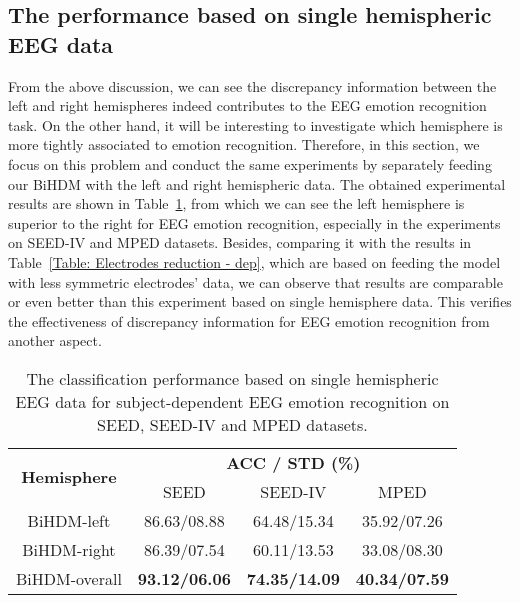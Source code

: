 \documentclass[journal]{IEEEtran}
\begin{document}
\subsection{The performance based on single hemispheric EEG data}
From the above discussion, we can see the discrepancy information between the left and right hemispheres indeed contributes to the EEG emotion recognition task. On the other hand, it will be interesting to investigate which hemisphere is more tightly associated to emotion recognition. Therefore, in this section, we focus on this problem and conduct the same experiments by separately feeding our BiHDM with the left and right hemispheric data. The obtained experimental results are shown in Table~\ref{Table: Single hemisphere}, from which we can see the left hemisphere is superior to the right for EEG emotion recognition, especially in the experiments on SEED-IV and MPED datasets. Besides, comparing it with the results in Table~\ref{Table: Electrodes reduction - dep}, which are based on feeding the model with less symmetric electrodes' data, we can observe that results are comparable or even better than this experiment based on single hemisphere data. This verifies the effectiveness of discrepancy information for EEG emotion recognition from another aspect.
\begin{table}[htb]
	\caption{The classification performance based on single hemispheric EEG data for subject-dependent EEG emotion recognition on SEED, SEED-IV and MPED datasets.}
	\centering
	\renewcommand{\arraystretch}{1.3}
	\begin{threeparttable}		
		\begin{tabular}{|c|c|c|c|} \hline
			\multirow{2}{*}{\textbf{Hemisphere}} & \multicolumn{3}{c|}{\textbf{ACC / STD (\%)}} \\ \cline{2-4}
			&  SEED            & SEED-IV          &   MPED\\ \hline
			BiHDM-left        & 86.63/08.88      & 64.48/15.34     & 35.92/07.26 \\ \hline
			BiHDM-right       & 86.39/07.54      & 60.11/13.53     & 33.08/08.30             \\ \hline
			BiHDM-overall    &\textbf{93.12/06.06} &\textbf{74.35/14.09}&\textbf{40.34/07.59}   \\ \hline
		\end{tabular}
		\begin{tablenotes}[para]
			\footnotesize 
		\end{tablenotes}
	\end{threeparttable}
	\label{Table: Single hemisphere}
\end{table}
\end{document}
